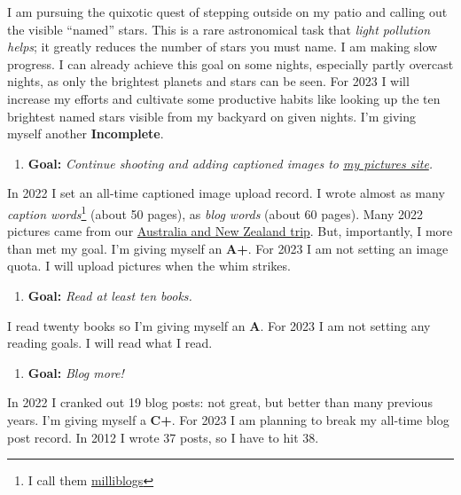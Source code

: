 I am pursuing the quixotic quest of stepping outside on my patio and
calling out the visible ``named'' stars. This is a rare astronomical
task that \emph{light pollution helps}; it greatly reduces the number of
stars you must name. I am making slow progress. I can already achieve
this goal on some nights, especially partly overcast nights, as only the
brightest planets and stars can be seen. For 2023 I will increase my
efforts and cultivate some productive habits like looking up the ten
brightest named stars visible from my backyard on given nights. I'm
giving myself another \textbf{Incomplete}.

\begin{enumerate}
\def\labelenumi{\arabic{enumi}.}
\setcounter{enumi}{2}
\item
  \textbf{Goal:} \emph{Continue shooting and adding captioned images to
  \href{https://conceptcontrol.smugmug.com/}{my pictures site}.}
\end{enumerate}

In 2022 I set an all-time captioned image upload record. I wrote almost
as many \emph{caption
words}\footnote{I call them
  \href{https://analyzethedatanotthedrivel.org/2016/05/22/milliblog-photo-captions/}{milliblogs}
} (about {5}0 pages), %
as \emph{blog words} (about 60 pages). Many 2022
pictures came from our
\href{https://conceptcontrol.smugmug.com/Trips/Overseas/Australia-New-Zealand-2022/i-FdKCt59}{Australia
and New Zealand trip}. But, importantly, I more than met my goal. I'm
giving myself an \textbf{A+}. For 2023 I am not setting an image quota.
I will upload pictures when the whim strikes.

\begin{enumerate}
\def\labelenumi{\arabic{enumi}.}
\setcounter{enumi}{3}
\item
  \textbf{Goal:} \emph{Read at least ten books.}
\end{enumerate}

I read twenty books so I'm giving myself an \textbf{A}. For 2023 I am
not setting any reading goals. I will read what I read.

\begin{enumerate}
\def\labelenumi{\arabic{enumi}.}
\setcounter{enumi}{4}
\item
  \textbf{Goal:} \emph{Blog more!}
\end{enumerate}

In 2022 I cranked out 19 blog posts: not great, but better than many
previous years. I'm giving myself a \textbf{C+}. For 2023 I am planning
to break my all-time blog post record. In 2012 I wrote 37 posts, so I
have to hit 38.

